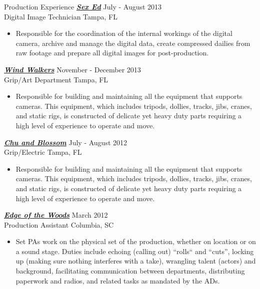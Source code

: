\begin{section}{Production Experience}
  {\sl \textbf{\href{http://http://www.imdb.com/title/tt2751310}{Sex Ed}}} \hfill July - August 2013 \\
  Digital Image Technician \hfill Tampa, FL
  \begin{itemize}
  \item
    Responsible for the coordination of the internal workings of the digital camera, archive and manage the digital data, create compressed dailies from raw footage and prepare all digital images for post-production.
  \end{itemize}

  {\sl \textbf{\href{http://www.imdb.com/title/tt1236254}{Wind Walkers}}} \hfill November - December 2013 \\
  Grip/Art Department \hfill Tampa, FL
  \begin{itemize}
  \item
    Responsible for building and maintaining all the equipment that supports cameras. This equipment, which includes tripods, dollies, tracks, jibs, cranes, and static rigs, is constructed of delicate yet heavy duty parts requiring a high level of experience to operate and move.
  \end{itemize}

  {\sl \textbf{\href{http://www.imdb.com/title/tt2339064}{Chu and Blossom}}} \hfill July - August 2012 \\
  Grip/Electric \hfill Tampa, FL
  \begin{itemize}
  \item
    Responsible for building and maintaining all the equipment that supports cameras. This equipment, which includes tripods, dollies, tracks, jibs, cranes, and static rigs, is constructed of delicate yet heavy duty parts requiring a high level of experience to operate and move.
  \end{itemize}

  {\sl \textbf{\href{http://www.imdb.com/title/tt3268422}{Edge of the Woods}}} \hfill March 2012 \\
  Production Assistant \hfill Columbia, SC
  \begin{itemize}
  \item
    Set PAs work on the physical set of the production, whether on location or on a sound stage. Duties include echoing (calling out) ``rolls`` and ``cuts'', locking up (making sure nothing interferes with a take), wrangling talent (actors) and background, facilitating communication between departments, distributing paperwork and radios, and related tasks as mandated by the ADs.
  \end{itemize}
\end{section}
